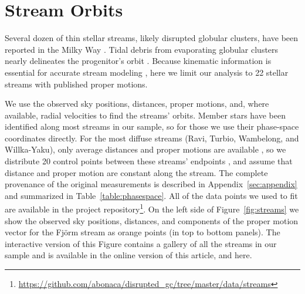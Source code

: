\documentclass[twocolumn]{aastex63}
\newcommand{\package}[1]{\textsl{#1}}
\begin{document}
\section{Stream Orbits}
\label{sec:orbits}

Several dozen of thin stellar streams, likely disrupted globular clusters, have been reported in the Milky Way \citep[an up-to-date list is available in the \package{galstreams} package,][]{mateu:2018}.
Tidal debris from evaporating globular clusters nearly delineates the progenitor's orbit \citep[e.g.,][]{kupper:2012}.
Because kinematic information is essential for accurate stream modeling \citep{bh:2018}, here we limit our analysis to 22 stellar streams with published proper motions.

We use the observed sky positions, distances, proper motions, and, where available, radial velocities to find the streams' orbits.
Member stars have been identified along most streams in our sample, so for those we use their phase-space coordinates directly.
For the most diffuse streams (Ravi, Turbio, Wambelong, and Willka-Yaku), only average distances and proper motions are available \citep{shipp:2019}, so we distribute 20 control points between these streams' endpoints \citep{riley:2020}, and assume that distance and proper motion are constant along the stream.
The complete provenance of the original measurements is described in Appendix~\ref{sec:appendix} and summarized in Table~\ref{table:phasespace}.
All of the data points we used to fit are available in the project repository\footnote{\url{https://github.com/abonaca/disrupted_gc/tree/master/data/streams}}.
On the left side of Figure~\ref{fig:streams} we show the observed sky positions, distances, and components of the proper motion vector for the Fj\" orm stream as orange points (in top to bottom panels).
The interactive version of this Figure contains a gallery of all the streams in our sample and is available in the online version of this article, and here.

\end{document}
